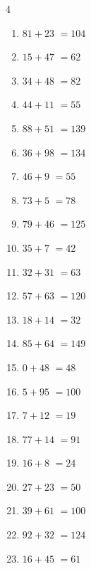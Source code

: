 \begin{multicols}{4}
\begin{enumerate}
  \item $81+23$
        $=104$

  \item $15+47$
        $=62$

  \item $34+48$
        $=82$

  \item $44+11$
        $=55$

\columnbreak %

\resetques

  \item $88+51$
        $=139$

  \item $36+98$
        $=134$

  \item $46+9$
        $=55$

  \item $73+5$
        $=78$

  \item $79+46$
        $=125$

  \item $35+7$
        $=42$

  \item $32+31$
        $=63$

  \item $57+63$
        $=120$

  \item $18+14$
        $=32$

  \item $85+64$
        $=149$

  \item $0+48$
        $=48$

  \item $5+95$
        $=100$

  \item $7+12$
        $=19$

  \item $77+14$
        $=91$

  \item $16+8$
        $=24$

  \item $27+23$
        $=50$

  \item $39+61$
        $=100$

  \item $92+32$
        $=124$

  \item $16+45$
        $=61$


\end{enumerate}
\end{multicols}
